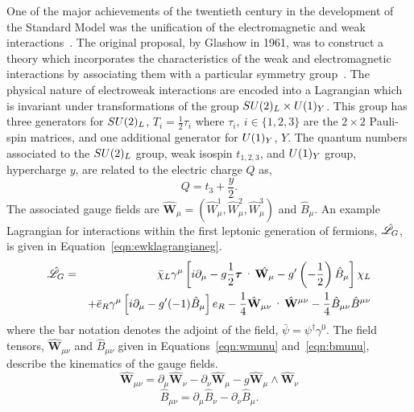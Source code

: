 One of the major achievements of the twentieth century in 
the development of the Standard Model was the unification of the electromagnetic 
and weak interactions~\citep{glashow,weinberg,salam}. 
The original proposal, by Glashow in 1961, was
to construct a theory which incorporates the characteristics of 
the weak and electromagnetic interactions by associating them 
with a particular symmetry group~\citep{glashow}.
The physical nature of electroweak interactions are encoded into a Lagrangian which 
is invariant under transformations of the group $SU(2)_{L}\times U(1)_{Y}$. 
This group has three generators for $SU(2)_{L}$, $T_{i} = \frac{1}{2}\tau_{i}$ 
where $\tau_{i},~i\in \{1,2,3 \}$ are the $2\times2$ Pauli-spin matrices, and one
additional generator for $U(1)_{Y}$, $Y$.
The quantum numbers associated to the $SU(2)_{L}$ group, weak isospin $t_{1,2,3}$, and 
$U(1)_{Y}$ group, hypercharge $y$, are related to the electric charge $Q$ as,
\begin{equation}
Q = t_{3}+\frac{y}{2}.
\end{equation} 
The associated gauge fields are 
$\hat{\mathbf{W}}_{\mu} = \left(\hat{W}_{\mu}^{1},\hat{W}_{\mu}^{2},\hat{W}_{\mu}^{3}\right)$
 and $\hat{B}_{\mu}$.
An example Lagrangian for interactions within the first leptonic generation of fermions, $\hat{\mathscr{L}}_{G}$, is 
given in Equation~\ref{eqn:ewklagrangianeg}.
\begin{eqnarray}
\lagr_{G} & =& \bar{\chi}_{L}\gamma^{\mu}\left[i\partial_{\mu} 
		   - g\frac{1}{2}\boldsymbol{\tau}\cdot\hat{\mathbf{W}_{\mu}}
		   - g^{\prime}\left(-\frac{1}{2}\right)\hat{B}_{\mu}\right] \chi_{L}
\nonumber \\
& &		   + \bar{e}_{R}\gamma^{\mu}\left[i\partial_{\mu} 
		   - g^{\prime}(-1)\hat{B}_{\mu}\right]{e}_{R}
		     -\frac{1}{4}
		     \hat{\mathbf{W}}_{\mu\nu}\cdot\hat{\mathbf{W}}^{\mu\nu} 
		     -\frac{1}{4}
		     \hat{B}_{\mu\nu}\hat{B}^{\mu\nu}
\label{eqn:ewklagrangianeg}
\end{eqnarray}
where the bar notation denotes the adjoint of the field, $\bar{\psi}=\psi^{\dagger}\gamma^{0}$.
The field tensors, $\hat{\mathbf{W}}_{\mu\nu}$ and $\hat{B}_{\mu\nu}$ given in 
Equations~\ref{eqn:wmunu} and~\ref{eqn:bmunu},
describe the kinematics of the gauge fields.
\begin{equation}
\hat{\mathbf{W}}_{\mu\nu} = \partial_{\mu}\hat{\mathbf{W}}_{\nu} - \partial_{\nu}\hat{\mathbf{W}}_{\mu} - g \hat{\mathbf{W}}_{\mu}\wedge\hat{\mathbf{W}}_{\nu}
\label{eqn:wmunu}
\end{equation}
\begin{equation}
\hat{B}_{\mu\nu} = \partial_{\mu}\hat{B}_{\nu} - \partial_{\nu}\hat{B}_{\mu}.
\label{eqn:bmunu}
\end{equation}

